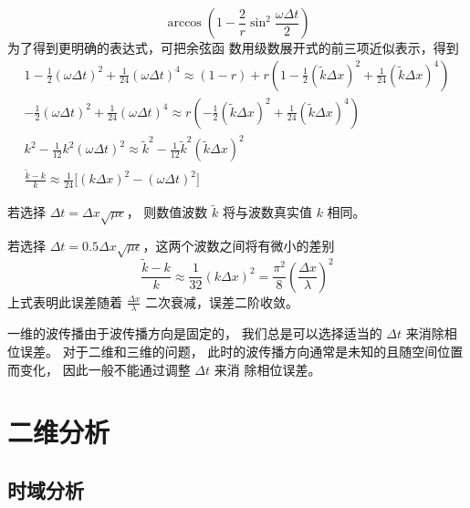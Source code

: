 \begin{solution}
\begin{equation*}
        \arccos \left(1-\frac{2}{r}\sin^2 \frac{\omega \Delta t}{2}\right)
    \end{equation*}
    为了得到更明确的表达式，可把余弦函
    数用级数展开式的前三项近似表示，得到
    \begin{gather*}
        1-\frac{1}{2}(\omega \Delta t)^2+\frac{1}{24}(\omega \Delta t)^4
        \approx (1-r)+r\left(1-\frac{1}{2}(\tilde{k} \Delta x)^2
        +\frac{1}{24}(\tilde{k} \Delta x)^4\right)\\
        -\frac{1}{2}(\omega \Delta t)^2+\frac{1}{24}(\omega \Delta t)^4
        \approx r\left(-\frac{1}{2}(\tilde{k} \Delta x)^2
        +\frac{1}{24}(\tilde{k} \Delta x)^4\right)\\
        k^2-\frac{1}{12}k^2(\omega \Delta t)^2 \approx
        \tilde{k}^2-\frac{1}{12}\tilde{k}^2(\tilde{k} \Delta x)^2\\
        \frac{\tilde{k}-k}{k}
        \approx\frac{1}{24}\Big[(k\Delta x)^2-(\omega \Delta t)^2\Big]
    \end{gather*}
\end{solution}

\begin{example}
    若选择 $\Delta t = \Delta x \sqrt{\mu \epsilon}$，
    则数值波数 $\tilde{k}$ 将与波数真实值 $k$ 相同。
\end{example}

\begin{example}
    若选择 $\Delta t = 0.5 \Delta x \sqrt{\mu \epsilon}$，这两个波数之间将有微小的差别
    \begin{equation*}
        \frac{\tilde{k}-k}{k}
        \approx\frac{1}{32}(k \Delta x)^2
        =\frac{\pi^2}{8}\left(\frac{\Delta x}{\lambda}\right)^2
    \end{equation*}
    上式表明此误差随着 $\frac{\Delta x}{\lambda}$ 二次衰减，误差二阶收敛。
\end{example}

\begin{note}
    一维的波传播由于波传播方向是固定的，
    我们总是可以选择适当的 $\Delta t$ 来消除相位误差。
    对于二维和三维的问题，
    此时的波传播方向通常是未知的且随空间位置而变化，
    因此一般不能通过调整 $\Delta t$ 来消
    除相位误差。
\end{note}

\section{二维分析}

\subsection{时域分析}

